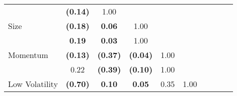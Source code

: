 \documentclass[12pt]{article}
\begin{document}
\begin{table}[H]
{\begin{tabular}{@{}lccccccccc@{}}
                      & {\color[HTML]{303498} \textbf{(0.14)}} & {\color[HTML]{303498} 1.00}            & \multicolumn{1}{l}{}                   & \multicolumn{1}{l}{}                   & \multicolumn{1}{l}{}                                     & \multicolumn{1}{l}{}                   & \multicolumn{1}{l}{}                                    & \multicolumn{1}{l}{}                                        & \multicolumn{1}{l}{}                                  \\
Size                  & \textbf{(0.18)}                        & \textbf{0.06}                          & 1.00                                   & \textbf{}                              & \textbf{}                                                & \textbf{}                              & \textbf{}                                               & \textbf{}                                                   & \textbf{}                                             \\
                      & {\color[HTML]{303498} \textbf{0.19}}   & {\color[HTML]{303498} \textbf{0.03}}   & {\color[HTML]{303498} 1.00}            & \multicolumn{1}{l}{}                   & \multicolumn{1}{l}{}                                     & \multicolumn{1}{l}{}                   & \multicolumn{1}{l}{}                                    & \multicolumn{1}{l}{}                                        & \multicolumn{1}{l}{}                                  \\
Momentum              & \textbf{(0.13)}                        & \textbf{(0.37)}                        & \textbf{(0.04)}                        & 1.00                                   & \textbf{}                                                & \textbf{}                              & \textbf{}                                               & \textbf{}                                                   & \textbf{}                                             \\
                      & {\color[HTML]{303498} 0.22}            & {\color[HTML]{303498} \textbf{(0.39)}} & {\color[HTML]{303498} \textbf{(0.10)}} & {\color[HTML]{303498} 1.00}            & \multicolumn{1}{l}{}                                     & \multicolumn{1}{l}{}                   & \multicolumn{1}{l}{}                                    & \multicolumn{1}{l}{}                                        & \multicolumn{1}{l}{}                                  \\
Low Volatility        & \textbf{(0.70)}                        & \textbf{0.10}                          & \textbf{0.05}                          & 0.35                                   & 1.00                                                     & \textbf{}                              & \textbf{}                                               & \textbf{}                                                   & \textbf{}                                             \\

\end{tabular}}
\end{table}
\end{document}
